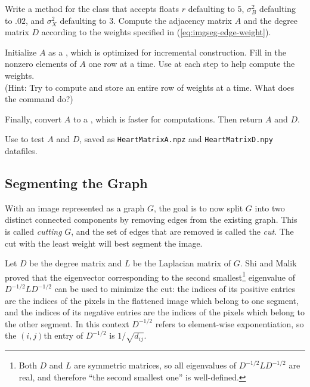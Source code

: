 \begin{problem}
Write a method for the  class that accepts floats $r$ defaulting to $5$, $\sigma_B^2$ defaulting to $.02$, and $\sigma_X^2$ defaulting to $3$.
Compute the adjacency matrix $A$ and the degree matrix $D$ according to the weights specified in (\ref{eq:imgseg-edge-weight}).

Initialize $A$ as a , which is optimized for incremental construction.
Fill in the nonzero elements of $A$ one row at a time.
Use  at each step to help compute the weights.
\\(Hint: Try to compute and store an entire row of weights at a time.
What does the command  do?)

Finally, convert $A$ to a , which is faster for computations.
Then return $A$ and $D$.

Use  to test $A$ and $D$, saved as \texttt{HeartMatrixA.npz} and \texttt{HeartMatrixD.npy} datafiles.
\label{prob:imgseg-compute-adjacency}
\end{problem}

\subsection*{Segmenting the Graph} %

With an image represented as a graph $G$, the goal is to now split $G$ into two distinct connected components by removing edges from the existing graph.
This is called \emph{cutting} $G$, and the set of edges that are removed is called the \emph{cut}.
The cut with the least weight will best segment the image.

Let $D$ be the degree matrix and $L$ be the Laplacian matrix of $G$.
Shi and Malik \cite{Shi2000} proved that the eigenvector corresponding to the second smallest\footnote{Both $D$ and $L$ are symmetric matrices, so all eigenvalues of $D^{-1/2}LD^{-1/2}$ are real, and therefore ``the second smallest one'' is well-defined.} eigenvalue of $D^{-1/2}LD^{-1/2}$ can be used to minimize the cut: the indices of its positive entries are the indices of the pixels in the flattened image which belong to one segment, and the indices of its negative entries are the indices of the pixels which belong to the other segment.
In this context $D^{-1/2}$ refers to element-wise exponentiation, so the $(i,j)$th entry of $D^{-1/2}$ is $1/\sqrt{d_{ij}}$.

